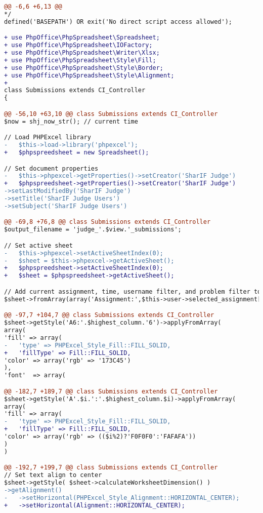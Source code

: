 \begin{lstlisting}[language=diff, caption=Perubahan kode program pada \textit{Submission.php}, label=lstt:8, basicstyle=\ttfamily, frame=single,
columns=fullflexible, keepspaces=true, breaklines=true]
@@ -6,6 +6,13 @@
*/
defined('BASEPATH') OR exit('No direct script access allowed');

+ use PhpOffice\PhpSpreadsheet\Spreadsheet;
+ use PhpOffice\PhpSpreadsheet\IOFactory;
+ use PhpOffice\PhpSpreadsheet\Writer\Xlsx;
+ use PhpOffice\PhpSpreadsheet\Style\Fill;
+ use PhpOffice\PhpSpreadsheet\Style\Border;
+ use PhpOffice\PhpSpreadsheet\Style\Alignment;
+ 
class Submissions extends CI_Controller
{

@@ -56,10 +63,10 @@ class Submissions extends CI_Controller
$now = shj_now_str(); // current time

// Load PHPExcel library
-   $this->load->library('phpexcel');
+   $phpspreedsheet = new Spreadsheet();

// Set document properties
-   $this->phpexcel->getProperties()->setCreator('SharIF Judge')
+   $phpspreedsheet->getProperties()->setCreator('SharIF Judge')
->setLastModifiedBy('SharIF Judge')
->setTitle('SharIF Judge Users')
->setSubject('SharIF Judge Users')

@@ -69,8 +76,8 @@ class Submissions extends CI_Controller
$output_filename = 'judge_'.$view.'_submissions';

// Set active sheet
-   $this->phpexcel->setActiveSheetIndex(0);
-   $sheet = $this->phpexcel->getActiveSheet();
+   $phpspreedsheet->setActiveSheetIndex(0);
+   $sheet = $phpspreedsheet->getActiveSheet();

// Add current assignment, time, username filter, and problem filter to document
$sheet->fromArray(array('Assignment:',$this->user->selected_assignment['name']), null, 'A1', true);

@@ -97,7 +104,7 @@ class Submissions extends CI_Controller
$sheet->getStyle('A6:'.$highest_column.'6')->applyFromArray(
array(
'fill' => array(
-   'type' => PHPExcel_Style_Fill::FILL_SOLID,
+   'fillType' => Fill::FILL_SOLID,
'color' => array('rgb' => '173C45')
),
'font'  => array(

@@ -182,7 +189,7 @@ class Submissions extends CI_Controller
$sheet->getStyle('A'.$i.':'.$highest_column.$i)->applyFromArray(
array(
'fill' => array(
-   'type' => PHPExcel_Style_Fill::FILL_SOLID,
+   'fillType' => Fill::FILL_SOLID,
'color' => array('rgb' => (($i%2)?'F0F0F0':'FAFAFA'))
)
)

@@ -192,7 +199,7 @@ class Submissions extends CI_Controller
// Set text align to center
$sheet->getStyle( $sheet->calculateWorksheetDimension() )
->getAlignment()
-   ->setHorizontal(PHPExcel_Style_Alignment::HORIZONTAL_CENTER);
+   ->setHorizontal(Alignment::HORIZONTAL_CENTER);


\end{lstlisting}
